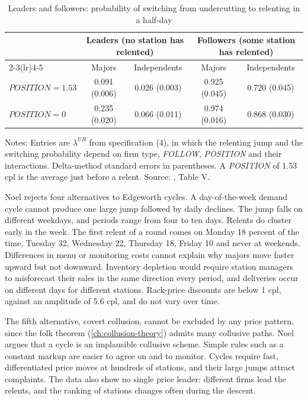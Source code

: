 \begin{table}[htbp]
\centering
\caption{Leaders and followers: probability of switching from undercutting to relenting in a half-day}\label{tab:13-noel-t5}
\small
\begin{tabular}{lcccc}
\toprule
 & \multicolumn{2}{c}{Leaders (no station has relented)} & \multicolumn{2}{c}{Followers (some station has relented)}\\
\cmidrule(lr){2-3}\cmidrule(lr){4-5}
 & Majors & Independents & Majors & Independents\\
\midrule
$\textit{POSITION}=1.53$ & 0.091 (0.006) & 0.026 (0.003) & 0.925 (0.045) & 0.720 (0.045)\\
$\textit{POSITION}=0$ & 0.235 (0.020) & 0.066 (0.011) & 0.974 (0.016) & 0.868 (0.030)\\
\bottomrule
\end{tabular}

\smallskip
\begin{minipage}{0.92\textwidth}\footnotesize
Notes: Entries are $\lambda^{UR}$ from specification (4), in which the relenting jump and the switching probability
depend on firm type, \textit{FOLLOW}, \textit{POSITION} and their interactions. Delta-method standard errors in
parentheses. A \textit{POSITION} of 1.53 cpl is the average just before a relent. Source: \citet{Noel2007}, Table V.
\end{minipage}
\end{table}

Noel rejects four alternatives to Edgeworth cycles. A day-of-the-week demand cycle cannot produce one large jump
followed by daily declines. The jump falls on different weekdays, and periods range from four to ten days. Relents
do cluster early in the week. The first relent of a round comes on Monday 18 percent of the time, Tuesday 32,
Wednesday 22, Thursday 18, Friday 10 and never at weekends. Differences in menu or monitoring costs cannot explain why majors move
faster upward but not downward. Inventory depletion would require station managers to misforecast their sales in the
same direction every period, and deliveries occur on different days for different stations. Rack-price discounts are
below 1 cpl, against an amplitude of 5.6 cpl, and do not vary over time.

The fifth alternative, covert collusion, cannot be excluded by any price pattern, since the folk theorem
(\cref{ch:collusion-theory}) admits many collusive paths. Noel argues that a cycle is an implausible collusive scheme.
Simple rules such as a constant markup are easier to agree on and to monitor. Cycles require fast, differentiated price
moves at hundreds of stations, and their large jumps attract complaints. The data also show no single price leader:
different firms lead the relents, and the ranking of stations changes often during the descent.

